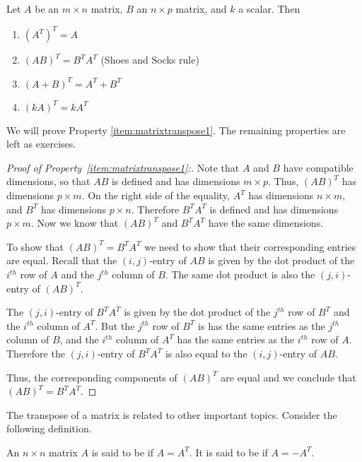 \documentclass{ximera}
\begin{document}
\begin{theorem}\label{th:transposeproperties}
Let $A$ be an $m\times n$ matrix, $B$ an $n\times p$ matrix, and $k$ a scalar. Then
\begin{enumerate}
\item\label{item:transoftrans}
$\left(A^{T}\right)^{T} = A$
\item\label{item:matrixtranspose1}
$\left( AB\right) ^{T}=B^{T}A^{T} $ (Shoes and Socks rule)
\item\label{item:matrixtranspose2}
$\left( A+ B\right) ^{T}=A^{T}+ B^{T}$  
\item\label{item:matrixtranspose3}
$\left(kA\right)^T=kA^T$
\end{enumerate}
\end{theorem}
We will prove Property \ref{item:matrixtranspose1}.  The remaining properties are left as exercises.
\begin{proof}[Proof of Property~\ref{item:matrixtranspose1}:]
Note that $A$ and $B$ have compatible dimensions, so that $AB$ is defined and has dimensions $m\times p$.  Thus, $(AB)^T$ has dimensions $p\times m$.  On the right side of the equality, $A^T$ has dimensions $n\times m$, and $B^T$ has dimensions $p\times n$.  Therefore $B^TA^T$ is defined and has dimensions $p\times m$.  Now we know that $(AB)^T$ and $B^TA^T$ have the same dimensions.

To show that $(AB)^T=B^TA^T$ we need to show that their corresponding entries are equal. 
Recall that the $(i,j)$-entry of $AB$ is given by
the dot product of the $i^{th}$ row of $A$ and the $j^{th}$ column of $B$.  
The same dot product is also the $(j,i)$-entry of $(AB)^T$.  

The $(j,i)$-entry of $B^TA^T$ is given by the dot product of the $j^{th}$ row of $B^T$ and the $i^{th}$ column of $A^T$.  But the $j^{th}$ row of $B^T$ is has the same entries as the $j^{th}$ column of $B$, and   the $i^{th}$ column of $A^T$ has the same entries as the $i^{th}$ row of $A$.  Therefore the $(j,i)$-entry of $B^TA^T$ is also equal to the $(i,j)$-entry of $AB$.

Thus, the corresponding components of $(AB)^T$ are equal and we conclude that $(AB)^T=B^TA^T$.
\end{proof}

The transpose of a matrix is related to other important topics. Consider the following definition.  

\begin{definition}\label{def:symmetricandskewsymmetric}
An $n\times n$ matrix $A$ is said to be
 if $A=A^{T}.$ It is said to be
 if $A=-A^{T}.$
\end{definition}
\end{document}

